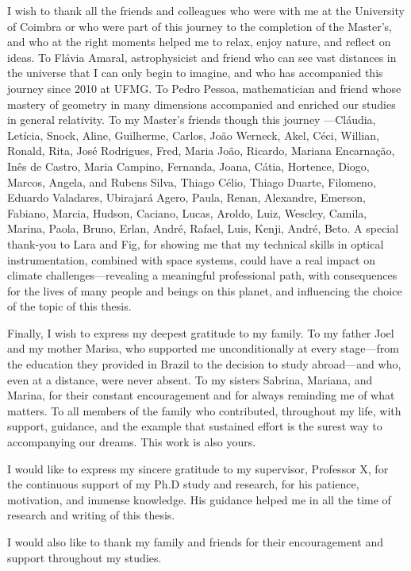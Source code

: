 I wish to thank all the friends and colleagues who were with me at the University of Coimbra or who were part of this journey to the completion of the Master's, and who at the right moments helped me to relax, enjoy nature, and reflect on ideas.
To Flávia Amaral, astrophysicist and friend who can see vast distances in the universe that I can only begin to imagine, and who has accompanied this journey since 2010 at UFMG. To Pedro Pessoa, mathematician and friend whose mastery of geometry in many dimensions accompanied and enriched our studies in general relativity.
To my Master's friends though this journey ---Cláudia, Letícia, Snock, Aline, Guilherme, Carlos, João Werneck, Akel, Céci, Willian, Ronald, Rita, José Rodrigues, Fred, Maria João, Ricardo, Mariana Encarnação, Inês de Castro, Maria Campino, Fernanda, Joana, Cátia, Hortence, Diogo, Marcos, Angela, and Rubens Silva, Thiago Célio, Thiago Duarte, Filomeno, Eduardo Valadares, Ubirajará Agero, Paula, Renan, Alexandre, Emerson, Fabiano, Marcia, Hudson, Caciano, Lucas, Aroldo, Luiz, Wescley, Camila, Marina, Paola, Bruno, Erlan, André, Rafael, Luis, Kenji, André, Beto.
A special thank-you to Lara and Fig, for showing me that my technical skills in optical instrumentation, combined with space systems, could have a real impact on climate challenges---revealing a meaningful professional path, with consequences for the lives of many people and beings on this planet, and influencing the choice of the topic of this thesis.

Finally, I wish to express my deepest gratitude to my family.
To my father Joel and my mother Marisa, who supported me unconditionally at every stage---from the education they provided in Brazil to the decision to study abroad---and who, even at a distance, were never absent.
To my sisters Sabrina, Mariana, and Marina, for their constant encouragement and for always reminding me of what matters.
To all members of the family who contributed, throughout my life, with support, guidance, and the example that sustained effort is the surest way to accompanying our dreams.
This work is also yours.

I would like to express my sincere gratitude to my supervisor, Professor X, for the continuous support of my Ph.D study and research, for his patience, motivation, and immense knowledge. His guidance helped me in all the time of research and writing of this thesis.

I would also like to thank my family and friends for their encouragement and support throughout my studies.
